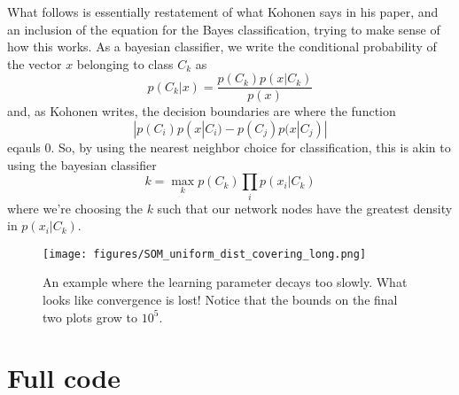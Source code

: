 \documentclass[pre,twocolumn,twoside,byrevtex,superscriptaddress]{revtex4}
\begin{document}
What follows is essentially restatement of what Kohonen says in his paper, and an inclusion of the equation for the Bayes classification, trying to make sense of how this works.
As a bayesian classifier, we write the conditional probability of the vector $x$ belonging to class $C_k$ as
\begin{equation}
  p(C_k|x) = \frac{p(C_k)p(x|C_k)}{p(x)}
\end{equation}
and, as Kohonen writes, the decision boundaries are where the function
\begin{equation}
  | p(C_i)p(x|C_i) - p(C_j)p(x|C_j) |
\end{equation}
eqauls 0.
So, by using the nearest neighbor choice for classification, this is akin to using the bayesian classifier
\begin{equation}
  k = \max_k p(C_k) \prod _i p(x_i|C_k)
\end{equation}
where we're choosing the $k$ such that our network nodes have the greatest density in $p(x_i|C_k)$.

\begin{figure}
 \centering
  \texttt{[image: figures/SOM\_uniform\_dist\_covering\_long.png]}
  \label{fig:2}
  \caption{An example where the learning parameter decays too slowly. What looks like convergence is lost! Notice that the bounds on the final two plots grow to $10^5$.}
\end{figure}




\clearpage
\pagebreak
\onecolumngrid

    \section*{Full code}

    
    
    
    



\end{document}
